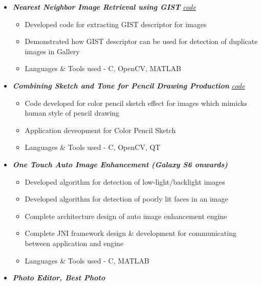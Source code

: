 \documentclass[letterpaper,11pt]{article}
\def\CC{{C\nolinebreak[4]\hspace{-.05em}\raisebox{.4ex}{\tiny\bf ++}}}
\newcommand{\resitem}[1]{\item #1 \vspace{-2pt}}
\begin{document}
\begin{itemize}
\begin{itemize}
\begin{itemize}
				\end{itemize}
				\vspace{2.5mm}
				\resitem[]{\faCircleO \hspace{1mm}\textbf{\emph{Nearest Neighbor Image Retrieval using GIST}}\hspace{1mm}
					\faGithub \hspace{1mm} \href{https://github.com/nrupatunga/GIST-global-Image-Descripor}{\emph{code}}}
				\begin{itemize}
						\resitem{Developed code for extracting GIST descriptor for images}
						\resitem{Demonstrated how GIST descriptor can be used for detection of duplicate images in Gallery}
						\resitem{Languages \& Tools used - \CC, OpenCV, MATLAB}
				\end{itemize}
				\vspace{2.5mm}
				\resitem[]{\faCircleO \hspace{1mm}\textbf{\emph{Combining Sketch and Tone for Pencil Drawing Production}}\hspace{1mm}
					\faGithub \hspace{1mm} \href{https://github.com/nrupatunga/Color-Pencil-Sketch}{\emph{code}}}
				\begin{itemize}
						\resitem{Code developed for color pencil sketch effect for images which mimicks human style of pencil drawing}
						\resitem{Application deveopment for Color Pencil Sketch}
						\resitem{Languages \& Tools used - \CC, OpenCV, QT}
				\end{itemize}
				\vspace{15mm}
				\resitem[]{\faCircleO \hspace{1mm}\textbf{\emph{One Touch Auto Image Enhancement (Galaxy S6 onwards)}}}
				\begin{itemize}
						\resitem{Developed algorithm for detection of low-light/backlight images}
						\resitem{Developed algorithm for detection of poorly lit faces in an image}
						\resitem{Complete architecture design of auto image enhancement engine }
						\resitem{Complete JNI framework design \& development for communicating between application and engine}
						\resitem{Languages \& Tools used - C, MATLAB}
				\end{itemize}
				\vspace{2.5mm}
				\resitem[]{\faCircleO \hspace{1mm}\textbf{\emph{Photo Editor, Best Photo}}}
				\begin{itemize}

\end{itemize}
\end{itemize}
\end{itemize}
\end{document}

